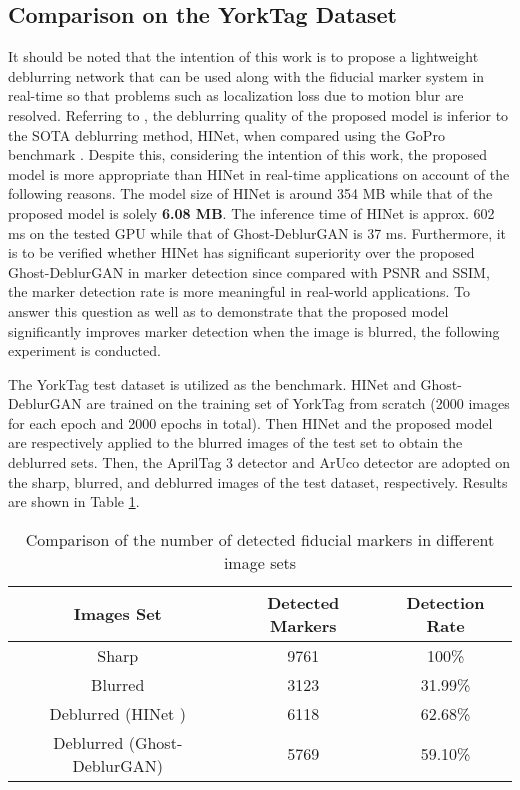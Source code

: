 \documentclass[letterpaper, 10 pt, conference]{ieeeconf}
\begin{document}
\subsection{Comparison on the YorkTag Dataset}
It should be noted that the intention of this work is to propose a lightweight deblurring network that can be used along with the fiducial marker system in real-time so that problems such as localization loss due to motion blur are resolved. Referring to \cite{chen2021hinet}, the deblurring quality of the proposed model is inferior to the SOTA deblurring method, HINet, when compared using the GoPro benchmark \cite{nah}. Despite this, considering the intention of this work, the proposed model is more appropriate than HINet \cite{chen2021hinet} in real-time applications on account of the following reasons. The model size of HINet is around 354 MB while that of the proposed model is solely \textbf{6.08 MB}. The inference time of HINet is approx. 602 ms on the tested GPU while that of Ghost-DeblurGAN is 37 ms. Furthermore, it is to be verified whether HINet has significant superiority over the proposed Ghost-DeblurGAN in marker detection since compared with PSNR and SSIM, the marker detection rate is more meaningful in real-world applications. To answer this question as well as to demonstrate that the proposed model significantly improves marker detection when the image is blurred, the following experiment is conducted.

The YorkTag test dataset is utilized as the benchmark. HINet and Ghost-DeblurGAN are trained on the training set of YorkTag from scratch (2000 images for each epoch and 2000 epochs in total). Then HINet and the proposed model are respectively applied to the blurred images of the test set to obtain the deblurred sets. Then, the AprilTag 3 detector \cite{ap3} and ArUco detector \cite{aruco} are adopted on the sharp, blurred, and deblurred images of the test dataset, respectively. Results are shown in Table \ref{tabdetection}.
\begin{table}[htb]
\caption{Comparison of the number of detected fiducial markers in different image sets}
\begin{center}
\begin{tabular}{c|c|c}
\hline\hline
Images Set & Detected Markers & Detection Rate \\ \hline
Sharp &9761 & 100\% \\ \hline
Blurred & 3123& 31.99\%\\ \hline
Deblurred (HINet \cite{chen2021hinet}) & 6118& 62.68\% \\ \hline
Deblurred (Ghost-DeblurGAN) & 5769& 59.10\% \\ \hline\hline
\end{tabular}
\label{tabdetection}
\end{center}
\end{table}
\end{document}
